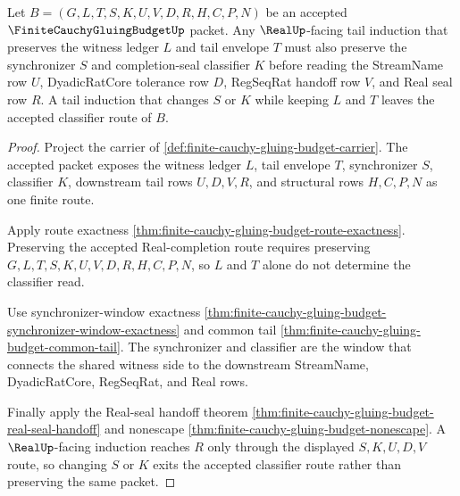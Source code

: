 \begin{theorem}
\label{thm:finite-cauchy-gluing-budget-tail-sync}
Let $B=(G,L,T,S,K,U,V,D,R,H,C,P,N)$ be an accepted $\FiniteCauchyGluingBudgetUp$ packet. Any $\RealUp$-facing tail induction that preserves the witness ledger $L$ and tail envelope $T$ must also preserve the synchronizer $S$ and completion-seal classifier $K$ before reading the StreamName row $U$, DyadicRatCore tolerance row $D$, RegSeqRat handoff row $V$, and Real seal row $R$. A tail induction that changes $S$ or $K$ while keeping $L$ and $T$ leaves the accepted classifier route of $B$.
\end{theorem}
\begin{proof}
Project the carrier of \autoref{def:finite-cauchy-gluing-budget-carrier}. The accepted packet exposes the witness ledger $L$, tail envelope $T$, synchronizer $S$, classifier $K$, downstream tail rows $U,D,V,R$, and structural rows $H,C,P,N$ as one finite route.

Apply route exactness \autoref{thm:finite-cauchy-gluing-budget-route-exactness}. Preserving the accepted Real-completion route requires preserving $G,L,T,S,K,U,V,D,R,H,C,P,N$, so $L$ and $T$ alone do not determine the classifier read.

Use synchronizer-window exactness \autoref{thm:finite-cauchy-gluing-budget-synchronizer-window-exactness} and common tail \autoref{thm:finite-cauchy-gluing-budget-common-tail}. The synchronizer and classifier are the window that connects the shared witness side to the downstream StreamName, DyadicRatCore, RegSeqRat, and Real rows.

Finally apply the Real-seal handoff theorem \autoref{thm:finite-cauchy-gluing-budget-real-seal-handoff} and nonescape \autoref{thm:finite-cauchy-gluing-budget-nonescape}. A $\RealUp$-facing induction reaches $R$ only through the displayed $S,K,U,D,V$ route, so changing $S$ or $K$ exits the accepted classifier route rather than preserving the same packet.
\end{proof}

